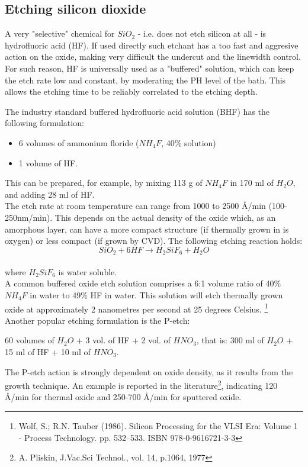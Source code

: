 \subsection{Etching silicon dioxide}
A very "selective" chemical for $SiO_2$ - i.e. does not etch silicon at all - is hydrofluoric acid (HF). If used directly such etchant has a too fast and aggresive action on the oxide, making very difficult the undercut and the linewidth control. For such reason, HF is universally used as a "buffered" solution, which can keep the etch rate low and constant, by moderating the PH level of the bath. This allows the etching time to be reliably correlated to the etching depth.

The industry standard buffered hydrofluoric acid solution (BHF\label{BHF}) has the following formulation:
\begin{itemize}
	\item 6 volumes of ammonium floride ($NH_4F$, 40\% solution)
	\item 1 volume of HF.
\end{itemize}
This can be prepared, for example, by mixing 113 g of $NH_4F$ in 170 ml of $H_2O$, and adding 28 ml of HF.\\
The etch rate at room temperature can range from 1000 to 2500 \r{A}/min (100-250nm/min).
This depends on the actual density of the oxide which, as an amorphous layer, can have a more compact structure (if thermally grown in is oxygen) or less compact (if grown by CVD).
The following etching reaction holds:
\begin{equation}
	SiO_2 + 6HF \rightarrow H_2SiF_6 + H_2O
\end{equation}\\
where $H_2SiF_6$ is water soluble.\\
A common buffered oxide etch solution comprises a 6:1 volume ratio of 40\% $NH_4F$ in water to 49\% HF in water. This solution will etch thermally grown oxide at approximately 2 nanometres per second at 25 degrees Celsius.\label{BHF_six_to_one}
\footnote{Wolf, S.; R.N. Tauber (1986). Silicon Processing for the VLSI Era: Volume 1 - Process Technology. pp. 532–533. ISBN 978-0-9616721-3-3} \\

Another popular etching formulation is the P-etch:

60 volumes of $H_2O$ + 3 vol. of HF + 2 vol. of $HNO_3$, that is: 300 ml of $H_2O$ + 15 ml of HF + 10 ml of $HNO_3$.

The P-etch action is strongly dependent on oxide density, as it results from the growth technique.
An example is reported in the literature\footnote{A. Pliskin, J.Vac.Sci Technol., vol. 14, p.1064, 1977}, indicating 120 \r{A}/min for thermal oxide and 250-700 \r{A}/min for sputtered oxide.

